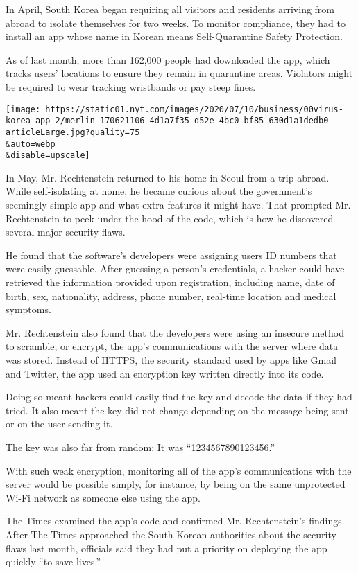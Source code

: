 In April, South Korea began requiring all visitors and residents
arriving from abroad to isolate themselves for two weeks. To monitor
compliance, they had to install an app whose name in Korean means
Self-Quarantine Safety Protection.

As of last month, more than 162,000 people had downloaded the app, which
tracks users' locations to ensure they remain in quarantine areas.
Violators might be required to wear tracking wristbands or pay steep
fines.

\texttt{[image: https://static01.nyt.com/images/2020/07/10/business/00virus-korea-app-2/merlin\_170621106\_4d1a7f35-d52e-4bc0-bf85-630d1a1dedb0-articleLarge.jpg?quality=75\\\&auto=webp\\\&disable=upscale]}

In May, Mr. Rechtenstein returned to his home in Seoul from a trip
abroad. While self-isolating at home, he became curious about the
government's seemingly simple app and what extra features it might have.
That prompted Mr. Rechtenstein to peek under the hood of the code, which
is how he discovered several major security flaws.

He found that the software's developers were assigning users ID numbers
that were easily guessable. After guessing a person's credentials, a
hacker could have retrieved the information provided upon registration,
including name, date of birth, sex, nationality, address, phone number,
real-time location and medical symptoms.

Mr. Rechtenstein also found that the developers were using an insecure
method to scramble, or encrypt, the app's communications with the server
where data was stored. Instead of HTTPS, the security standard used by
apps like Gmail and Twitter, the app used an encryption key written
directly into its code.

Doing so meant hackers could easily find the key and decode the data if
they had tried. It also meant the key did not change depending on the
message being sent or on the user sending it.

The key was also far from random: It was ``1234567890123456.''

With such weak encryption, monitoring all of the app's communications
with the server would be possible simply, for instance, by being on the
same unprotected Wi-Fi network as someone else using the app.

The Times examined the app's code and confirmed Mr. Rechtenstein's
findings. After The Times approached the South Korean authorities about
the security flaws last month, officials said they had put a priority on
deploying the app quickly ``to save lives.''

